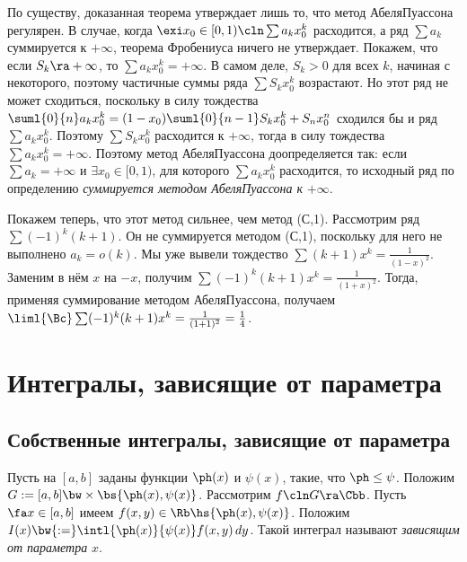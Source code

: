 \documentclass[a4paper]{article}
\begin{document}
\begin{note}
По существу, доказанная теорема утверждает лишь то, что метод Абеля\ч Пуассона регулярен.
В случае, когда $\exi x_0 \in [0,1)\cln \sum a_kx_0^k$ расходится, а ряд $\sum a_k$ суммируется к $+\infty$,
теорема Фробениуса ничего не утверждает. Покажем, что если $S_k \ra +\infty$, то $\sum a_kx_0^k = +\infty$.
В самом деле, $S_k>0$ для всех $k$, начиная с некоторого, поэтому частичные суммы ряда $\sum S_kx_0^k$
возрастают. Но этот ряд не может сходиться, поскольку в силу тождества
$\suml{0}{n} a_kx_0^k=(1-x_0)\suml{0}{n-1}S_kx_0^k + S_nx_0^n$ сходился бы и ряд $\sum a_k x_0^k$. Поэтому
$\sum S_k x_0^k$ расходится к $+\infty$, тогда в силу тождества $\sum a_k x^k_0 = +\infty$. Поэтому
метод Абеля\ч Пуассона доопределяется так: если $\sum a_k = +\infty$ и $\exi x_0 \in [0,1)$,
для которого $\sum a_k x_0^k$ расходится, то исходный ряд по определению
\emph{суммируется методом Абеля\ч Пуассона к} $+\infty$.
\end{note}

Покажем теперь, что этот метод сильнее, чем метод (С,1). Рассмотрим ряд $\sum (-1)^k(k+1)$.
Он не суммируется методом (С,1), поскольку для него не выполнено $a_k=o(k)$. Мы уже вывели
тождество $\sum (k+1)x^k = \frac{1}{(1-x)^2}$. Заменим в нём $x$ на $-x$,
получим $\sum (-1)^k(k+1)x^k=\frac{1}{(1+x)^2}$. Тогда, применяя суммирование методом Абеля\ч Пуассона, получаем
$\liml{\Bc} \sum (-1)^k(k+1)x^k=\frac{1}{(1+1)^2}= \frac{1}{4}$.

\section{Интегралы, зависящие от параметра}

\subsection{Собственные интегралы, зависящие от параметра}

\begin{df}
Пусть на $[a,b]$ заданы функции $\ph(x)$ и $\psi(x)$, такие, что $\ph \le \psi$. Положим $G :=
[a,b]\bw\times\bs{\ph(x),\psi(x)}$. Рассмотрим $f\cln G \ra \Cbb$. Пусть $\fa x \in [a,b]$ имеем $f(x,y)
\in\Rb\hs{\ph(x), \psi(x)}$. Положим $I(x) \bw{:=} \intl{\ph(x)}{\psi(x)}f(x,y)\,d y$. Такой интеграл
называют \emph{зависящим от параметра} $x$.
\end{df}
\end{document}
